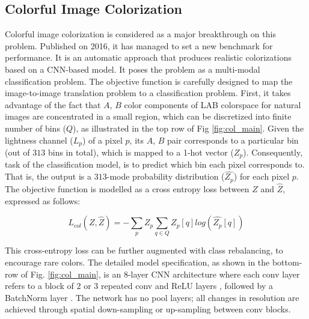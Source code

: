 \documentclass[10pt]{article}
\begin{document}
\subsection{\textbf{Colorful Image Colorization}}
Colorful image colorization \cite{zhang2016colorful} is considered as a major breakthrough on this problem. Published on 2016, it has managed to set a new benchmark for performance. It is an automatic approach that produces realistic colorizations based on a CNN-based model. 
It poses the problem as a multi-modal classification problem. The objective function is carefully designed to map the image-to-image translation problem to a classification problem. First, it takes advantage of the fact that $A$, $B$ color components of LAB colorspace for natural images are concentrated in a small region, which can be discretized into finite number of bins ($Q$), as illustrated in the top row of Fig \ref{fig:col_main}. 
Given the lightness channel ($L_p$) of a pixel $p$, its $A$, $B$ pair corresponds to a particular bin (out of $313$ bins in total), which is mapped to a 1-hot vector ($Z_p$). 
Consequently, task of the classification model, is to predict which bin each pixel corresponds to. That is, the output is a $313$-mode probability distribution ($ \hat{Z_p}$) for each pixel $p$. The objective function is modelled as a cross entropy loss between $Z$ and $\hat{Z}$, expressed as follows: 

\[ L_{col}(Z, \hat{Z}) = - \sum_p Z_p \sum_{q \in Q} Z_p[q] log(\hat{Z_p}[q])   \] 

This cross-entropy loss can be further augmented with class rebalancing, to encourage rare colors. The detailed model specification, as shown in the bottom-row of Fig. \ref{fig:col_main}, is an 8-layer CNN architecture where each conv layer refers to a block of $2$ or $3$ repeated
conv and ReLU layers \cite{nair2010rectified}, followed by a BatchNorm layer \cite{ioffe2015batch}. The network has no pool layers; 
all changes in resolution are achieved through spatial down-sampling or up-sampling between conv blocks.


\end{document}
